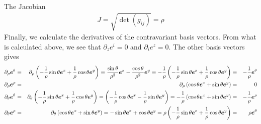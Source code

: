 %
The Jacobian
%
\begin{align*}
    J=\sqrt{\det(g_{ij})}=\rho
\end{align*}
%
Finally, we calculate the derivatives of the contravariant basis vectors.
From what is calculated above, we see that $\partial_z e^i=0$ and $\partial_i e^z=0$.
The other basis vectors gives
%
\begin{align*}
    \partial_\rho \boldsymbol{e}^\theta
    &=&
    \partial_\rho
    \left( - \frac{1}{\rho} \sin\theta \boldsymbol{e}^x
        + \frac{1}{\rho} \cos\theta \boldsymbol{e}^y \right)
    =
        \frac{\sin\theta}{\rho^2} \boldsymbol{e}^x
        - \frac{\cos\theta}{\rho^2} \boldsymbol{e}^y
    =
    - \frac{1}{\rho}
    \left( - \frac{1}{\rho} \sin\theta \boldsymbol{e}^x
        + \frac{1}{\rho} \cos\theta \boldsymbol{e}^y \right)
    &=&
    - \frac{1}{\rho} \boldsymbol{e}^\theta
    \\
    \partial_\rho \boldsymbol{e}^\rho
    &=&
    \partial_\rho
    \left( \cos\theta \boldsymbol{e}^x
        + \sin\theta \boldsymbol{e}^y \right)
    &=&
    0
    \\
    \partial_\theta \boldsymbol{e}^\theta
    &=&
    \partial_\theta
    \left( - \frac{1}{\rho} \sin\theta \boldsymbol{e}^x
        + \frac{1}{\rho} \cos\theta \boldsymbol{e}^y \right)
    =
    \left( - \frac{1}{\rho} \cos\theta \boldsymbol{e}^x
        - \frac{1}{\rho} \sin\theta \boldsymbol{e}^y \right)
    =
    - \frac{1}{\rho}
    \left( \cos\theta \boldsymbol{e}^x
        + \sin\theta \boldsymbol{e}^y \right)
    &=&
    - \frac{1}{\rho}
    \boldsymbol{e}^\rho
    \\
    \partial_\theta \boldsymbol{e}^\rho
    &=&
    \partial_\theta
    \left( \cos\theta \boldsymbol{e}^x
        + \sin\theta \boldsymbol{e}^y \right)
    =
        - \sin\theta \boldsymbol{e}^x
        + \cos\theta \boldsymbol{e}^y
    =
    \rho
    \left( - \frac{1}{\rho} \sin\theta \boldsymbol{e}^x
        + \frac{1}{\rho} \cos\theta \boldsymbol{e}^y \right)
    &=&
    \rho
    \boldsymbol{e}^\theta
\end{align*}
%

